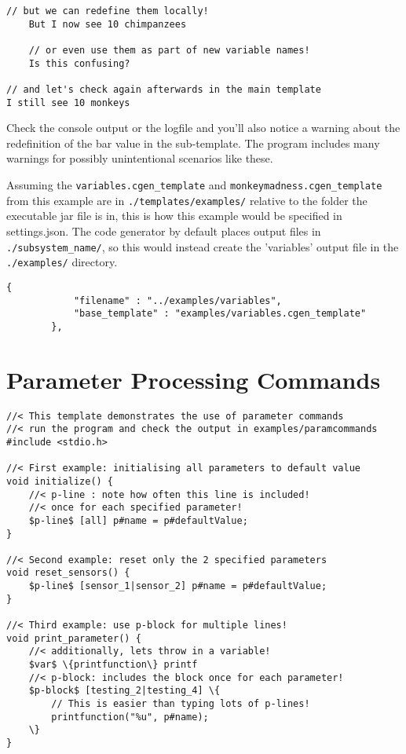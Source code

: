 \documentclass{settings/TU_Delft_Report}
\begin{document}
\begin{appendices}
\begin{lstlisting}[caption={result},label={ex1:result},language={}]
	// but we can redefine them locally!
	But I now see 10 chimpanzees
	
	// or even use them as part of new variable names!
	Is this confusing?

// and let's check again afterwards in the main template
I still see 10 monkeys

\end{lstlisting}

Check the console output or the logfile and you'll also notice a warning about the redefinition of the bar value in the sub-template. The program includes many warnings for possibly unintentional scenarios like these.

\noindent Assuming the \lstinline{variables.cgen_template} and \lstinline{monkeymadness.cgen_template} from this example are in \lstinline{./templates/examples/} relative to the folder the executable jar file is in, this is how this example would be specified in settings.json. The code generator by default places output files in \lstinline{./subsystem_name/}, so this would instead create the 'variables' output file in the \lstinline{./examples/} directory.

\begin{lstlisting}[caption={specifying this example in settings.json}, language = {}]
		{
			"filename" : "../examples/variables",
			"base_template" : "examples/variables.cgen_template"
		},
\end{lstlisting}

\newpage
\section{Parameter Processing Commands}
\begin{lstlisting}[caption={parameter commands example}, language = {}]
//< This template demonstrates the use of parameter commands
//< run the program and check the output in examples/paramcommands
#include <stdio.h>

//< First example: initialising all parameters to default value
void initialize() {
	//< p-line : note how often this line is included!
	//< once for each specified parameter!
	$p-line$ [all] p#name = p#defaultValue;
}

//< Second example: reset only the 2 specified parameters
void reset_sensors() {
	$p-line$ [sensor_1|sensor_2] p#name = p#defaultValue;
}

//< Third example: use p-block for multiple lines!
void print_parameter() {
	//< additionally, lets throw in a variable!
	$var$ \{printfunction\} printf
	//< p-block: includes the block once for each parameter!
	$p-block$ [testing_2|testing_4] \{
		// This is easier than typing lots of p-lines!
		printfunction("%u", p#name);
	\}
}


\end{lstlisting}
\end{appendices}
\end{document}
